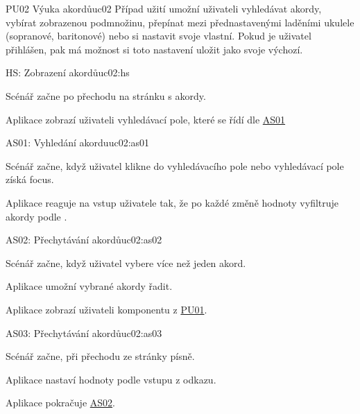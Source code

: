 \begin{usecase}{PU02 Výuka akordů}{uc02}
    Případ užití umožní uživateli vyhledávat akordy, vybírat zobrazenou podmnožinu, přepínat mezi přednastavenými laděními ukulele (sopranové, baritonové) nebo si nastavit svoje vlastní. Pokud je uživatel přihlášen, pak má možnost si toto nastavení uložit jako svoje výchozí.

    \begin{scenario}{HS: Zobrazení akordů}{uc02:hs}
        \item Scénář začne po přechodu na stránku s akordy.
        \item Aplikace zobrazí uživateli vyhledávací pole, které se řídí dle \hyperref[uc02:as01]{AS01}
    \end{scenario}

    \begin{scenario}{AS01: Vyhledání akordu}{uc02:as01}
        \item Scénář začne, když uživatel klikne do vyhledávacího pole nebo vyhledávací pole získá focus.
        \item Aplikace reaguje na vstup uživatele tak, že po každé změně hodnoty vyfiltruje akordy podle .
    \end{scenario}

    \begin{scenario}{AS02: Přechytávání akordů}{uc02:as02}
        \item Scénář začne, když uživatel vybere více než jeden akord.
        \item Aplikace umožní vybrané akordy řadit.
        \item Aplikace zobrazí uživateli komponentu z \hyperref[uc01]{PU01}.
    \end{scenario}

    \begin{scenario}{AS03: Přechytávání akordů}{uc02:as03}
        \item Scénář začne, při přechodu ze stránky písně.
        \item Aplikace nastaví hodnoty podle vstupu z odkazu.
        \item Aplikace pokračuje \hyperref[uc02:as02]{AS02}.
    \end{scenario}



\end{usecase}
